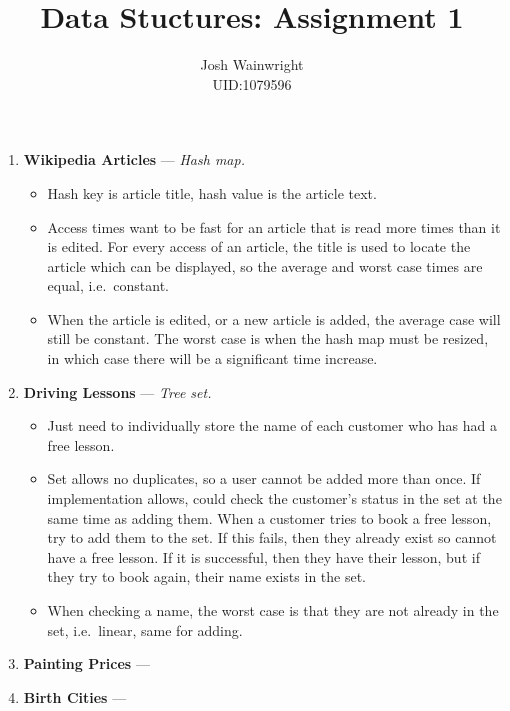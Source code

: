 \documentclass[11pt]{article} %
\author{Josh Wainwright \\ UID:1079596}
\title{Data Stuctures: Assignment 1 }
\date{}
\begin{document}
\maketitle


\begin{enumerate}
	\item \textbf{Wikipedia Articles} --- \textit{Hash map.}

		\begin{itemize}
			\item Hash key is article title, hash value is the article text.
			\item Access times want to be fast for an article that is read more times
				than it is edited. For every access of an article, the title is used to
				locate the article which can be displayed, so the average and worst
				case times are equal, i.e.\ constant.
			\item When the article is edited, or a new article is added, the average
				case will still be constant. The worst case is when the hash map must
				be resized, in which case there will be a significant time increase.
		\end{itemize}

	\item \textbf{Driving Lessons } --- \textit{Tree set.}

		\begin{itemize}
			\item Just need to individually store the name of each customer who has had
				a free lesson.
			\item Set allows no duplicates, so a user cannot be added more than once.
				If implementation allows, could check the customer's status in the set
				at the same time as adding them. When a customer tries to book a free
				lesson, try to add them to the set. If this fails, then they already
				exist so cannot have a free lesson. If it is successful, then they have
				their lesson, but if they try to book again, their name exists in the
				set.
			\item When checking a name, the worst case is that they are not already in
				the set, i.e.\ linear, same for adding.
		\end{itemize}

	\item \textbf{Painting Prices} --- \textit{}

	\item \textbf{Birth Cities} --- \textit{}

\end{enumerate}
\end{document}
